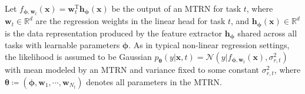 \documentclass[10pt]{article} %
\theoremstyle{plain}
\theoremstyle{definition}
\begin{document}
Let $f_{\boldsymbol{\phi},\mathbf{w}_t}(\mathbf{x})=\mathbf{w}_t^{\text{T}}\mathbf{h}_{\boldsymbol{\phi}}(\mathbf{x})$ be the output of an MTRN for task $t$, 
where $\mathbf{w}_t\in\mathbb{R}^{d}$ are the regression weights in the linear head for task $t$, and $\mathbf{h}_{\boldsymbol{\phi}}(\mathbf{x})\in\mathbb{R}^{d}$ is the data representation produced by the feature extractor $\mathbf{h}_{\boldsymbol{\phi}}$ shared across all tasks with learnable parameters $\boldsymbol{\phi}$.
As in typical non-linear regression settings, the likelihood is assumed to be Gaussian $p_{\boldsymbol{\theta}}(y|\mathbf{x},t)=\mathcal{N}(y|f_{\boldsymbol{\phi},\mathbf{w}_t}(\mathbf{x}),\sigma_{r,t}^2)$ with mean modeled by an MTRN and variance fixed to some constant $\sigma_{r,t}^2$, where $\boldsymbol{\theta}\coloneqq(\boldsymbol{\phi},\mathbf{w}_1,\cdots,\mathbf{w}_{N_t})$ denotes all parameters in the MTRN.
\end{document}
